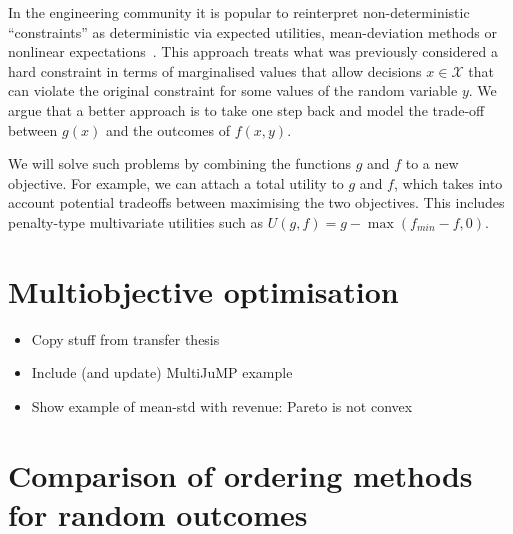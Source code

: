 \documentclass[main.tex]{subfiles}
\begin{document}
In the engineering community it is popular to
reinterpret non-deterministic ``constraints'' as deterministic via
expected utilities, mean-deviation methods or nonlinear
expectations~\cite{tyrrell2015engineering}.
This approach treats what was previously considered a hard constraint
in terms of marginalised values that allow decisions $x\in\mathcal{X}$
that can violate the original constraint for some values of the random
variable $y$. We argue that a better approach is to take one step back
and model the trade-off between $g(x)$ and the outcomes of $f(x,y)$.

We will solve such problems by combining the functions $g$ and $f$ to
a new objective. For example, we can attach a total utility to $g$ and
$f$, which takes into account potential tradeoffs between maximising
the two objectives. This includes penalty-type multivariate utilities
such as $U(g,f)=g-\max(f_{min}-f,0)$.


\section{Multiobjective optimisation}\label{sec:one_multiobjective}
\begin{itemize}
\item Copy stuff from transfer thesis
\item Include (and update) MultiJuMP example
\item Show example of mean-std with revenue: Pareto is not convex
\end{itemize}

\section{Comparison of ordering methods for random outcomes}\label{sec:one_comparison_orderings}



\biblio{} %
\end{document}
